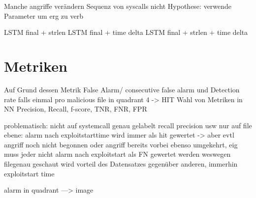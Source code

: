 Manche angriffe verändern Sequenz von syscalls nicht
Hypothese:
verwende Parameter um erg zu verb

LSTM final + strlen
LSTM final + time delta
LSTM final + strlen + time delta



\section{Metriken}
\label{sec:metrik}

Auf Grund dessen Metrik False Alarm/ consecutive false alarm und Detection rate falls einmal pro malicious file in quadrant 4 -> HIT
Wahl von Metriken in NN
Precision, Recall, f-score, TNR, FNR, FPR

problematisch:
nicht auf systemcall genau gelabelt
recall precision usw nur auf file ebene:
alarm nach exploitstarttime wird immer als hit gewertet -> aber evtl angriff noch nicht begonnen
oder angriff bereits vorbei
ebenso umgekehrt, eig muss jeder nicht alarm nach exploitstart als FN gewertet werden
weswegen filegenau geschaut wird
vorteil des Datensatzes gegenüber anderen, immerhin exploitstart time

alarm in quadrant ---> image




